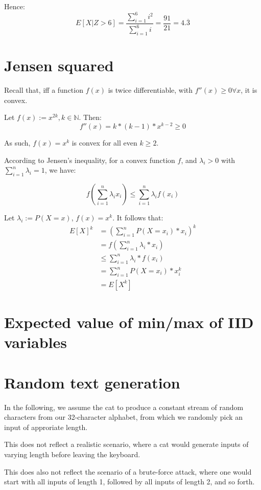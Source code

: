 \documentclass[a4paper]{scrreprt}
\begin{document}
Hence:
\[
	E[X | Z > 6] = \frac{\sum_{i=1}^6{i^2}}{\sum_{i=1}^6{i}} = \frac{91}{21} = 4.\overline{3}
\]

\section{Jensen squared}

Recall that, iff a function $f(x)$ is twice differentiable, with $f''(x) \geq 0
\forall x$, it is convex.

Let $f(x) := x^{2k}, k \in \mathbb{N}$. Then:
\[
	f''(x) = k * (k-1) * x^{k-2} \geq 0
\]

As such, $f(x) = x^k$ is convex for all even $k \geq 2$.

According to Jensen's inequality, for a convex function $f$, and $\lambda_i >
0$ with $\sum_{i=1}^n \lambda_i = 1$, we have:

\[
	f(\sum_{i=1}^n{\lambda_i x_i}) \leq \sum_{i=1}^n{\lambda_i f(x_i)}
\]

Let $\lambda_i := P(X = x)$, $f(x) = x^k$. It follows that:
\begin{align}
	E[X]^k & = (\sum_{i=1}^n{P(X=x_i) * x_i})^k \\
	& = f(\sum_{i=1}^n{\lambda_i * x_i}) \\
	& \leq \sum_{i=1}^n{\lambda_i * f(x_i)} \\
	& = \sum_{i=1}^n{P(X=x_i) * x_i^k} \\
	& = E[X^k]
\end{align}

\section{Expected value of min/max of IID variables}

\section{Random text generation}

In the following, we assume the cat to produce a constant stream of random
characters from our 32-character alphabet, from which we randomly pick an input
of approriate length.

This does not reflect a realistic scenario, where a cat would generate inputs
of varying length before leaving the keyboard.

This does also not reflect the scenario of a brute-force attack, where one
would start with all inputs of length 1, followed by all inputs of length 2,
and so forth.
\end{document}
